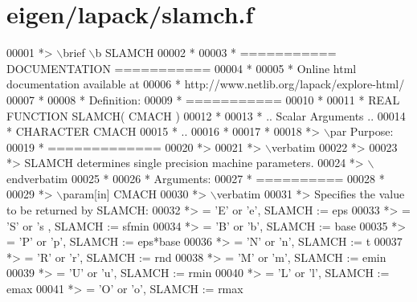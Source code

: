 \hypertarget{eigen_2lapack_2slamch_8f_source}{}\section{eigen/lapack/slamch.f}
\label{eigen_2lapack_2slamch_8f_source}

\begin{DoxyCode}
00001 \textcolor{comment}{*> \(\backslash\)brief \(\backslash\)b SLAMCH}
00002 \textcolor{comment}{*}
00003 \textcolor{comment}{*  =========== DOCUMENTATION ===========}
00004 \textcolor{comment}{*}
00005 \textcolor{comment}{* Online html documentation available at }
00006 \textcolor{comment}{*            http://www.netlib.org/lapack/explore-html/ }
00007 \textcolor{comment}{*}
00008 \textcolor{comment}{*  Definition:}
00009 \textcolor{comment}{*  ===========}
00010 \textcolor{comment}{*}
00011 \textcolor{comment}{*      REAL             FUNCTION SLAMCH( CMACH )}
00012 \textcolor{comment}{*}
00013 \textcolor{comment}{*     .. Scalar Arguments ..}
00014 \textcolor{comment}{*      CHARACTER          CMACH}
00015 \textcolor{comment}{*     ..}
00016 \textcolor{comment}{*  }
00017 \textcolor{comment}{*}
00018 \textcolor{comment}{*> \(\backslash\)par Purpose:}
00019 \textcolor{comment}{*  =============}
00020 \textcolor{comment}{*>}
00021 \textcolor{comment}{*> \(\backslash\)verbatim}
00022 \textcolor{comment}{*>}
00023 \textcolor{comment}{*> SLAMCH determines single precision machine parameters.}
00024 \textcolor{comment}{*> \(\backslash\)endverbatim}
00025 \textcolor{comment}{*}
00026 \textcolor{comment}{*  Arguments:}
00027 \textcolor{comment}{*  ==========}
00028 \textcolor{comment}{*}
00029 \textcolor{comment}{*> \(\backslash\)param[in] CMACH}
00030 \textcolor{comment}{*> \(\backslash\)verbatim}
00031 \textcolor{comment}{*>          Specifies the value to be returned by SLAMCH:}
00032 \textcolor{comment}{*>          = 'E' or 'e',   SLAMCH := eps}
00033 \textcolor{comment}{*>          = 'S' or 's ,   SLAMCH := sfmin}
00034 \textcolor{comment}{*>          = 'B' or 'b',   SLAMCH := base}
00035 \textcolor{comment}{*>          = 'P' or 'p',   SLAMCH := eps*base}
00036 \textcolor{comment}{*>          = 'N' or 'n',   SLAMCH := t}
00037 \textcolor{comment}{*>          = 'R' or 'r',   SLAMCH := rnd}
00038 \textcolor{comment}{*>          = 'M' or 'm',   SLAMCH := emin}
00039 \textcolor{comment}{*>          = 'U' or 'u',   SLAMCH := rmin}
00040 \textcolor{comment}{*>          = 'L' or 'l',   SLAMCH := emax}
00041 \textcolor{comment}{*>          = 'O' or 'o',   SLAMCH := rmax}

\end{DoxyCode}
